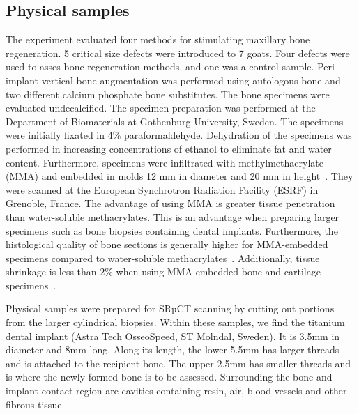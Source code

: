 \subsection{Physical samples}

The experiment evaluated four methods for stimulating maxillary bone
regeneration. 5 critical size defects were introduced to 7 goats. Four defects
were used to asses bone regeneration methods, and one was a control sample.
Peri-implant vertical bone augmentation was performed using autologous bone and
two different calcium phosphate bone substitutes. The bone specimens were
evaluated undecalcified. The specimen preparation was performed at the
Department of Biomaterials at Gothenburg University, Sweden. The specimens were
initially fixated in 4\% paraformaldehyde. Dehydration of the specimens was
performed in increasing concentrations of ethanol to eliminate fat and water
content. Furthermore, specimens were infiltrated with methylmethacrylate (MMA)
and embedded in molds 12 mm in diameter and 20 mm in
height~\cite{NELDAM2015682}. They were scanned at the European Synchrotron
Radiation Facility (ESRF) in Grenoble, France. The advantage of using MMA is
greater tissue penetration than water-soluble methacrylates. This is an
advantage when preparing larger specimens such as bone biopsies containing
dental implants. Furthermore, the histological quality of bone sections is
generally higher for MMA-embedded specimens compared to water-soluble
methacrylates~\cite{erben1997}. Additionally, tissue shrinkage is less than 2\%
when using MMA-embedded bone and cartilage specimens~\cite{ferguson1999}.

Physical samples were prepared for SRµCT scanning by cutting out portions from
the larger cylindrical biopsies. Within these samples, we find the titanium
dental implant (Astra Tech OsseoSpeed, ST Molndal, Sweden).  It is 3.5mm in
diameter and 8mm long. Along its length, the lower 5.5mm has larger threads and
is attached to the recipient bone. The upper 2.5mm has smaller threads and is
where the newly formed bone is to be assessed. Surrounding the bone and implant
contact region are cavities containing resin, air, blood vessels and other
fibrous tissue.

